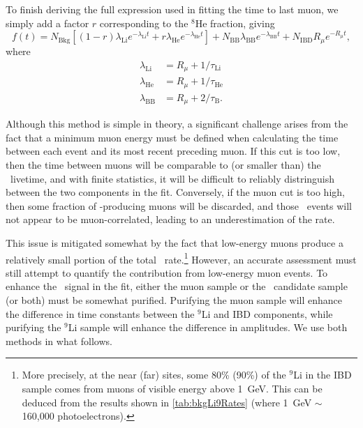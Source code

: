 \documentclass[../thesis.tex]{subfiles}
\begin{document}
To finish deriving the full expression used in fitting the time to last muon, we simply add a factor $r$ corresponding to the $^8$He fraction, giving
\begin{equation}
  \label{eq:bkgLi9FullExpr}
  f(t) = N_{\mathrm{Bkg}} \left[ (1-r)\lambda_{\mathrm{Li}} e^{-\lambda_{\mathrm{Li}} t} + r\lambda_{\mathrm{He}} e^{-\lambda_{\mathrm{He}} t }\right] + N_{\mathrm{BB}} \lambda_{\mathrm{BB}} e^{-\lambda_{\mathrm{BB}} t} + N_{\mathrm{IBD}} R_\mu e^{-R_\mu t},
\end{equation}
where
\begin{align*}
  \lambda_{\mathrm{Li}} &= R_\mu + 1/\tau_{\mathrm{Li}} \\
  \lambda_{\mathrm{He}} &= R_\mu + 1/\tau_{\mathrm{He}} \\
  \lambda_{\mathrm{BB}} &= R_\mu + 2/\tau_{\mathrm{B}}.
\end{align*}

Although this method is simple in theory, a significant challenge arises from the fact that a minimum muon energy must be defined when calculating the time between each event and its most recent preceding muon. If this cut is too low, then the time between muons will be comparable to (or smaller than) the \linine\ livetime, and with finite statistics, it will be difficult to reliably distringuish between the two components in the fit. Conversely, if the muon cut is too high, then some fraction of \linine-producing muons will be discarded, and those \linine\ events will not appear to be muon-correlated, leading to an underestimation of the rate.

This issue is mitigated somewhat by the fact that low-energy muons produce a relatively small portion of the total \linine\ rate.\footnote{More precisely, at the near (far) sites, some 80\% (90\%) of the $^9$Li in the IBD sample comes from muons of visible energy above 1~GeV. This can be deduced from the results shown in \autoref{tab:bkgLi9Rates} (where 1~GeV $\sim$ 160,000 photoelectrons).}
However, an accurate assessment must still attempt to quantify the contribution from low-energy muon events. To enhance the \linine\ signal in the fit, either the muon sample or the \linine\ candidate sample (or both) must be somewhat purified. Purifying the muon sample will enhance the difference in time constants between the $^9$Li and IBD components, while purifying the $^9$Li sample will enhance the difference in amplitudes. We use both methods in what follows.
\end{document}
